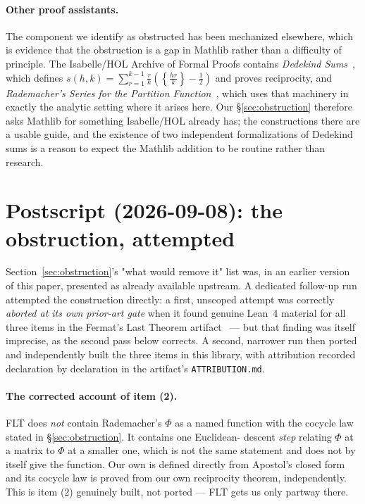 \documentclass[11pt, a4paper]{article}
\newcommand{\lean}[1]{\ifmmode\text{\ttfamily\detokenize{#1}}\else{\ttfamily\detokenize{#1}}\fi}
\theoremstyle{remark}
\begin{document}
\paragraph{Other proof assistants.}
The component we identify as obstructed has been mechanized elsewhere, which is evidence that the
obstruction is a gap in Mathlib rather than a difficulty of principle. The Isabelle/HOL Archive of
Formal Proofs contains \emph{Dedekind Sums}~\cite{AFPDedekind}, which defines
$s(h,k) = \sum_{r=1}^{k-1}\frac{r}{k}\left(\left\{\frac{hr}{k}\right\}-\frac12\right)$ and proves
reciprocity, and \emph{Rademacher's Series for the Partition Function}~\cite{AFPRademacher}, which
uses that machinery in exactly the analytic setting where it arises here. Our
\S\ref{sec:obstruction} therefore asks Mathlib for something Isabelle/HOL already has; the
constructions there are a usable guide, and the existence of two independent formalizations of
Dedekind sums is a reason to expect the Mathlib addition to be routine rather than research.

\section{Postscript (2026-09-08): the obstruction, attempted}\label{sec:postscript}

Section~\ref{sec:obstruction}'s "what would remove it" list was, in an earlier version of this
paper, presented as already available upstream. A dedicated follow-up run attempted the
construction directly: a first, unscoped attempt was correctly \emph{aborted at its own prior-art
gate} when it found genuine Lean~4 material for all three items in the Fermat's Last Theorem
artifact~\cite{FLT2026} --- but that finding was itself imprecise, as the second pass below
corrects. A second, narrower run then ported and independently built the three items in this
library, with attribution recorded declaration by declaration in the artifact's
\texttt{ATTRIBUTION.md}.

\paragraph{The corrected account of item (2).} FLT does \emph{not} contain Rademacher's $\Phi$ as a
named function with the cocycle law stated in \S\ref{sec:obstruction}. It contains one Euclidean-
descent \emph{step} relating $\Phi$ at a matrix to $\Phi$ at a smaller one, which is not the same
statement and does not by itself give the function. Our own \lean{rademacherPhi} is defined
directly from Apostol's closed form and its cocycle law is proved from our own reciprocity
theorem, independently. This is item (2) genuinely built, not ported --- FLT gets us only partway
there.
\end{document}

